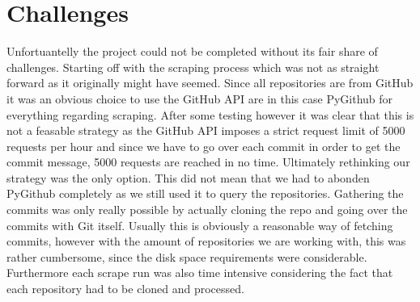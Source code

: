 \section{Challenges}
\label{sec:challenges}

Unfortuantelly the project could not be completed without its fair share of
challenges. Starting off with the scraping process which was not as straight
forward as it originally might have seemed. Since all repositories are from
GitHub it was an obvious choice to use the GitHub API are in this case PyGithub
for everything regarding scraping. After some testing however it was clear that
this is not a feasable strategy as the GitHub API imposes a strict request
limit of 5000 requests per hour and since we have to go over each commit in
order to get the commit message, 5000 requests are reached in no time.
Ultimately rethinking our strategy was the only option. This did not mean that
we had to abonden PyGithub completely as we still used it to query the
repositories. Gathering the commits was only really possible by actually
cloning the repo and going over the commits with Git itself. Usually this is
obviously a reasonable way of fetching commits, however with the amount of
repositories we are working with, this was rather cumbersome, since the disk
space requirements were considerable. Furthermore each scrape run was also time
intensive considering the fact that each repository had to be cloned and
processed.

